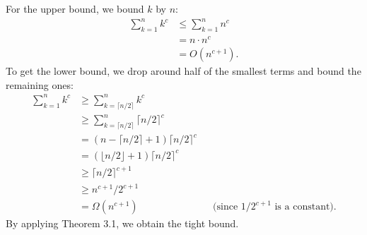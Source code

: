 For the upper bound, we bound $k$ by $n$:
\begin{align*}
    \sum_{k=1}^nk^c &\le \sum_{k=1}^nn^c \\
    &= n\cdot n^c \\
    &= O(n^{c+1}).
\end{align*}
To get the lower bound, we drop around half of the smallest terms and bound the remaining ones:
\begin{align*}
    \sum_{k=1}^nk^c &\ge \sum_{k=\lceil n/2\rceil}^nk^c \\
    &\ge \sum_{k=\lceil n/2\rceil}^n\lceil n/2\rceil^c \\
    &= (n-\lceil n/2\rceil+1)\lceil n/2\rceil^c \\
    &= (\lfloor n/2\rfloor+1)\lceil n/2\rceil^c \\
    &\ge \lceil n/2\rceil^{c+1} \\
    &\ge n^{c+1}\!/2^{c+1} \\
    &= \Omega(n^{c+1}) && \text{(since $1/2^{c+1}$ is a constant)}.
\end{align*}
By applying Theorem 3.1, we obtain the tight bound.
